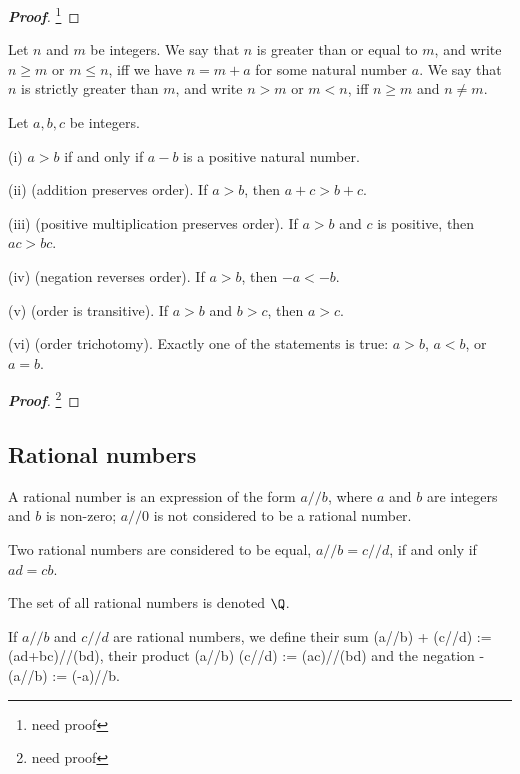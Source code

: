 \begin{proof}[\bf Proof]
\footnote{need proof}
\end{proof}

\begin{definition}
Let $n$ and $m$ be integers. We say that $n$ is greater than or equal to $m$, and write $n\geq m$ or $m\leq n$, iff we have $n=m+a$ for some natural number $a$. We say that $n$ is strictly greater than $m$, and write $n>m$ or $m<n$, iff $n\geq m$ and $n\neq m$.
\end{definition}

\begin{proposition}
Let $a,b,c$ be integers.
\ben
\item [(i)] $a>b$ if and only if $a-b$ is a positive natural number.
\item [(ii)] (addition preserves order). If $a>b$, then $a+c>b+c$.
\item [(iii)] (positive multiplication preserves order). If $a>b$ and $c$ is positive, then $ac >bc$.
\item [(iv)] (negation reverses order). If $a>b$, then $-a<-b$.
\item [(v)] (order is transitive). If $a>b$ and $b>c$, then $a>c$.
\item [(vi)] (order trichotomy). Exactly one of the statements is true: $a>b$, $a<b$, or $a=b$.
\een
\end{proposition}

\begin{proof}[\bf Proof]
\footnote{need proof}
\end{proof}

\subsection{Rational numbers}

\begin{definition}
A rational number is an expression of the form $a//b$, where $a$ and $b$ are integers and $b$ is non-zero; $a//0$ is not considered to be a rational number.

Two rational numbers are considered to be equal, $a//b = c//d$, if and only if $ad = cb$.

The set of all rational numbers is denoted $\Q$.
\end{definition}

\begin{definition}
If $a//b$ and $c//d$ are rational numbers, we define their sum
\be
(a//b) + (c//d) := (ad+bc)//(bd),
\ee
their product
\be
(a//b) \times (c//d) := (ac)//(bd)
\ee
and the negation
\be
-(a//b) := (-a)//b.
\ee
\end{definition}

